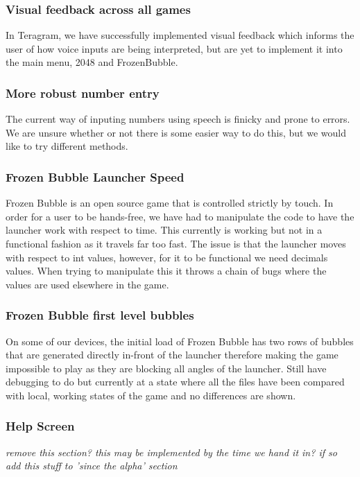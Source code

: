 \documentclass[11pt, oneside]{article}
\begin{document}
\subsubsection*{Visual feedback across all games}
In Teragram, we have successfully implemented visual feedback which
informs the user of how voice inputs are being interpreted, but are
yet to implement it into the main menu, 2048 and FrozenBubble.


\subsubsection*{More robust number entry}
The current way of inputing numbers using speech is finicky and prone to
errors. We are unsure whether or not there is some easier way to do this,
but we would like to try different methods.


\subsubsection*{Frozen Bubble Launcher Speed}
Frozen Bubble is an open source game that is controlled strictly by touch. 
In order for a user to be hands-free, we have had to manipulate the code 
to have the launcher work with respect to time. This currently is working
but not in a functional fashion as it travels far too fast. The issue is 
that the launcher moves with respect to int values, however, for it to be 
functional we need decimals values. When trying to manipulate this it 
throws a chain of bugs where the values are used elsewhere in the game. 


\subsubsection*{Frozen Bubble first level bubbles}
On some of our devices, the initial load of Frozen Bubble has two rows of 
bubbles that are generated directly in-front of the launcher therefore making
the game impossible to play as they are blocking all angles of the launcher. 
Still have debugging to do but currently at a state where all the files have 
been compared with local, working states of the game and no differences are
shown.


\subsubsection*{Help Screen}

{\em remove this section? this may be implemented by the time we hand
  it in? if so add this stuff to 'since the alpha' section}
\end{document}
